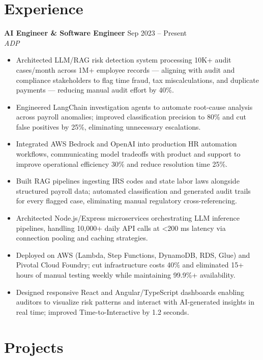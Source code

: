 \documentclass[10pt,letterpaper]{article}
\newcommand{\entry}[3]{%
  \vspace{3pt}\textbf{#1} \hfill #3 \\
  \textit{\small #2}\vspace{1pt}}
\begin{document}
\section{Experience}

\entry{AI Engineer \& Software Engineer}{ADP}{Sep 2023 -- Present}
\begin{itemize}
  \item Architected LLM/RAG risk detection system processing 10K+ audit cases/month across 1M+ employee records --- aligning with audit and compliance stakeholders to flag time fraud, tax miscalculations, and duplicate payments --- reducing manual audit effort by 40\%.
  \item Engineered LangChain investigation agents to automate root-cause analysis across payroll anomalies; improved classification precision to 80\% and cut false positives by 25\%, eliminating unnecessary escalations.
  \item Integrated AWS Bedrock and OpenAI into production HR automation workflows, communicating model tradeoffs with product and support to improve operational efficiency 30\% and reduce resolution time 25\%.
  \item Built RAG pipelines ingesting IRS codes and state labor laws alongside structured payroll data; automated classification and generated audit trails for every flagged case, eliminating manual regulatory cross-referencing.
  \item Architected Node.js/Express microservices orchestrating LLM inference pipelines, handling 10,000+ daily API calls at \textless{}200 ms latency via connection pooling and caching strategies.
  \item Deployed on AWS (Lambda, Step Functions, DynamoDB, RDS, Glue) and Pivotal Cloud Foundry; cut infrastructure costs 40\% and eliminated 15+ hours of manual testing weekly while maintaining 99.9\%+ availability.
  \item Designed responsive React and Angular/TypeScript dashboards enabling auditors to visualize risk patterns and interact with AI-generated insights in real time; improved Time-to-Interactive by 1.2 seconds.
\end{itemize}

\section{Projects}
\end{document}
